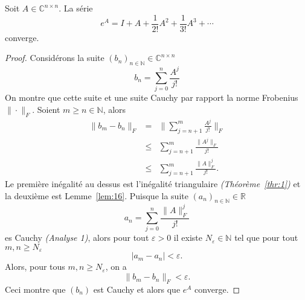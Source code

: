   \begin{lemma}
    \label{lem:17}
    Soit $A ∈ ℂ^{n ×n}$. La série
    \begin{displaymath}
      e^A = I + A + \frac{1}{2!} A^2 + \frac{1}{3!}A^3 + \cdots 
    \end{displaymath}
    converge.  
  \end{lemma}

  \begin{proof}


    Considérons  la suite $(b_n)_{n\in \mathbb{N}} ∈ ℂ^{n ×n}$
    \begin{displaymath}      
      b_n = \sum _{j=0 }^{ n } \frac { { A }^{ j } }{ j! }  
    \end{displaymath}
%    
    On montre que cette suite  et une suite Cauchy par rapport la norme Frobenius $\|⋅\|_F$. 
    Soient $m≥n \in \mathbb{N}$, alors
    \begin{eqnarray*}
      \parallel b_{ m }-b_{ n }\parallel _{ F } & = & \parallel \sum _{ j=n+1 }^{ m }{ \frac { A^{ j } }{ j! }  } \parallel _{ F }\\
       & \le &  \sum_{j=n+1}^{m}{\frac{\parallel A^j\parallel_{F}}{j!}} \\ 
                                                & \le &  \sum_{j=n+1}^{m}{\frac{\parallel A\parallel_{F}^{j}}{j!}}.
    \end{eqnarray*}
    Le première inégalité au dessus est l'inégalité triangulaire \emph{(Théorème~\ref{thr:1})} et la deuxième est Lemme~\ref{lem:16}.  
    Puisque la suite $(a_n)_{n\in \mathbb{N}} ∈ ℝ$
    \begin{displaymath}
      a_n = \sum_{j=0}^{n}{\frac{\parallel A\parallel_{F}^{j}}{j!}}
    \end{displaymath}
    es Cauchy  \emph{(Analyse 1)}, alors pour tout $ε>0$ il existe $N_ε ∈ ℕ$ tel que pour tout $m,n ≥ N_ε$
    \begin{displaymath}
      |a_m - a_n | < ε. 
    \end{displaymath}
    Alors, pour tous  $m,n ≥ N_ε$, on a
    \begin{displaymath}
      \parallel b_{ m }-b_{ n }\parallel _{ F }  < ε.  
    \end{displaymath}
    Ceci montre que $(b_n)$ est Cauchy et alors que $e^A$ converge. 
  \end{proof}

